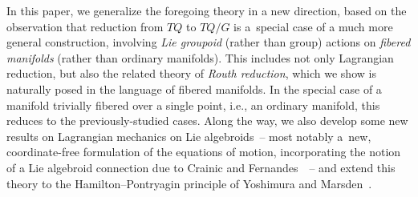 \documentclass[pdftex]{sigma}
\numberwithin{equation}{section}
\begin{document}
In this paper, we generalize the foregoing theory in a new direction, based on the observation that reduction from $ T Q $ to $ T Q / G $ is a~special case of a much more general construction, involving \emph{Lie groupoid} (rather than group) actions on \emph{fibered manifolds} (rather than ordinary manifolds). This includes not only Lagrangian reduction, but also the related theory of \emph{Routh reduction}, which we show is naturally posed in the language of f\/ibered manifolds. In the special case of a manifold trivially f\/ibered over a single point, i.e., an ordinary manifold, this reduces to the previously-studied cases. Along the way, we also develop some new results on Lagrangian mechanics on Lie algebroids~-- most notably a~new, coordinate-free formulation of the equations of motion, incorporating the notion of a Lie algebroid connection due to Crainic and Fernandes~\cite{CrFe2003}~-- and extend this theory to the Hamilton--Pontryagin principle of Yoshimura and Marsden~\cite{YoMa2006b}.
\end{document}
